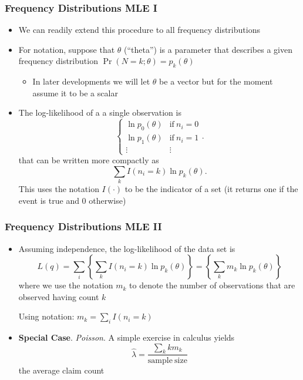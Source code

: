 \documentclass{beamer}
\begin{document}
\begin{frame}%
 \frametitle{Frequency Distributions MLE I}
 \begin{itemize}
\item We can readily extend this procedure to all frequency
distributions \vspace{2mm}
\item For notation, suppose that $\theta$ (``theta'') is a parameter that describes a given frequency distribution $\Pr(N=k; \theta) =
p_k(\theta)$ \vspace{2mm}
 \begin{itemize}\item In later developments we will let $\theta$ be a vector but for the moment assume it to be a
 scalar\end{itemize} \vspace{2mm}
\item The log-likelihood of a a single observation is
\begin{equation*}
\left\{
\begin{array}{ll}
\ln p_0(\theta) & \mathrm{if}\ n_i=0 \\
\ln p_1(\theta) & \mathrm{if}\ n_i=1 \\
\vdots & \vdots
\end{array}
\right. .
\end{equation*}
that can be written more compactly as
\begin{equation*}
\sum_k I(n_i=k) \ln p_k(\theta).
\end{equation*} \vspace{2mm}
This uses the notation $I(\cdot)$ to be the indicator of a set (it
returns one if the event is true and 0 otherwise)
 \end{itemize}
 \end{frame}

\begin{frame}[shrink=2]
 \frametitle{Frequency Distributions MLE II}
 \begin{itemize}
\item Assuming independence, the log-likelihood of the data set is
\begin{equation*}
L(q)=\sum_i \left\{ \sum_k I(n_i=k) \ln p_k(\theta) \right\} = \left\{ \sum_k m_k\ln p_k(\theta) \right\}
\end{equation*}
where we use the notation $m_k$ to denote the number of observations
that are observed having count $k$ \vspace{2mm}

Using notation: $m_k = \sum_i I(n_i=k)$ \vspace{2mm}
\item \textbf{Special Case}. \textit{Poisson}. A simple exercise in calculus yields
$$ \hat{\lambda} =  \frac{\sum_k k m_k}{\mathrm{sample ~size}}$$
the average claim count
 \end{itemize}
 \end{frame}
\end{document}
